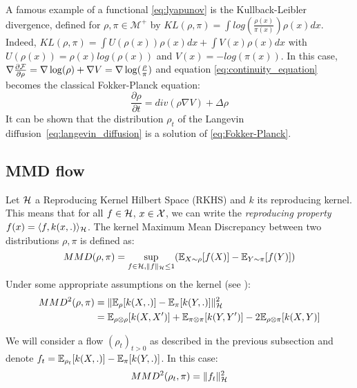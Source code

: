 \begin{remark} 
	A famous example of a functional \eqref{eq:lyapunov} is the Kullback-Leibler divergence, defined for $\rho, \pi \in \mathcal{M}^+$ by
	$KL(\rho,\pi)=\int log(\frac{\rho(x)}{\pi(x)})\rho(x)dx$. Indeed, $KL(\rho, \pi)=\int U(\rho(x))\rho(x)dx + \int V(x) \rho(x)dx$ with $U(\rho(x))=\rho(x)log(\rho(x))$ and $V(x)=-log(\pi(x))$. In this case, $\nabla \frac{\partial {{\mathcal F}}}{\partial \rho}= \nabla \log(\rho) + \nabla V=  \nabla \log(\frac{\rho}{\pi})$ and equation \eqref{eq:continuity_equation} becomes the classical Fokker-Planck equation:
	\begin{equation}\label{eq:Fokker-Planck}
	\frac{\partial{\rho}}{\partial t}= div(\rho \nabla V )+ \Delta \rho
	\end{equation}
	It can be shown that the distribution $\rho_t$ of the Langevin diffusion~\eqref{eq:langevin_diffusion} is a solution of \eqref{eq:Fokker-Planck}.
\end{remark}

\subsection{MMD flow}



Let ${{\mathcal H}}$ a Reproducing Kernel Hilbert Space (RKHS) and $k$ its reproducing kernel. This means that for all $f \in {{\mathcal H}}$, $x \in {{\mathcal X}}$, we can write the \textit{reproducing property} $f(x)=\langle f, k(x,.) \rangle_{{{\mathcal H}}}$. The kernel Maximum Mean Discrepancy between two distributions $\rho,\pi$ is defined as:
\begin{equation}
MMD(\rho,\pi)=\sup_{f \in {{\mathcal H}},  \|f\|_{{{\mathcal H}}}\le 1} ({{\mathbb E}}_{X \sim \rho}[f(X)]-{{\mathbb E}}_{Y \sim \pi}[f(Y)])
\end{equation}
Under some appropriate assumptions on the kernel (see \cite{gretton2012kernel}):
\begin{align}
MMD^2(\rho,\pi)&=\|{{\mathbb E}}_{\rho}[k(X,.)] - {{\mathbb E}}_{\pi}[k(Y,.)]\|^2_{{{\mathcal H}}}\\
&={{\mathbb E}}_{\rho \otimes \rho}[k(X,X')]+{{\mathbb E}}_{\pi \otimes \pi}[k(Y,Y')] - 2{{\mathbb E}}_{\rho \otimes \pi}[k(X,Y)]
\end{align}

We will consider a flow $(\rho_t)_{t>0}$ as described in the previous subsection and denote $f_t= {{\mathbb E}}_{\rho_t}[k(X,.)]- {{\mathbb E}}_{\pi}[k(Y,.)]$. In this case:
\begin{equation}
MMD^2(\rho_t,\pi)=\|f_t\|^2_{{{\mathcal H}}}
\end{equation} 

